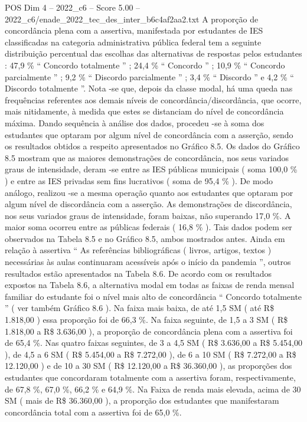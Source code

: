 \begin{textsample}{POS Dim 4 – 2022\_c6 – Score 5.00 – 2022\_c6/enade\_2022\_tec\_des\_inter\_b6c4af2aa2.txt}
A proporção de concordância plena com a assertiva, manifestada por estudantes de IES classificadas na categoria administrativa pública federal tem a seguinte distribuição percentual das escolhas das alternativas de respostas pelos estudantes : 47,9 \% “ Concordo totalmente ” ; 24,4 \% “ Concordo ” ; 10,9 \% “ Concordo parcialmente ” ; 9,2 \% “ Discordo parcialmente ” ; 3,4 \% “ Discordo ” e 4,2 \% “ Discordo totalmente ”.
Nota -se que, depois da classe modal, há uma queda nas frequências referentes aos demais níveis de concordância/discordância, que ocorre, mais nitidamente, à medida que estes se distanciam do nível de concordância máxima.
Dando sequência à análise dos dados, procedeu -se à soma dos estudantes que optaram por algum nível de concordância com a asserção, sendo os resultados obtidos a respeito apresentados no Gráfico 8.5.
Os dados do Gráfico 8.5 mostram que as maiores demonstrações de concordância, nos seus variados graus de intensidade, deram -se entre as IES públicas municipais ( soma 100,0 \% ) e entre as IES privadas sem fins lucrativos ( soma de 95,4 \% ).
De modo análogo, realizou -se a mesma operação quanto aos estudantes que optaram por algum nível de discordância com a asserção.
As demonstrações de discordância, nos seus variados graus de intensidade, foram baixas, não superando 17,0 \%.
A maior soma ocorreu entre as públicas federais ( 16,8 \% ).
Tais dados podem ser observados na Tabela 8.5 e no Gráfico 8.5, ambos mostrados antes.
Ainda em relação à assertiva “ As referências bibliográficas ( livros, artigos, textos ) necessárias às aulas continuaram acessíveis após o início da pandemia ”, outros resultados estão apresentados na Tabela 8.6.
De acordo com os resultados expostos na Tabela 8.6, a alternativa modal em todas as faixas de renda mensal familiar do estudante foi o nível mais alto de concordância “ Concordo totalmente ” ( ver também Gráfico 8.6 ).
Na faixa mais baixa, de até 1,5 SM ( até R\$ 1.818,00 ) essa proporção foi de 66,3 \%.
Na faixa seguinte, de 1,5 a 3 SM ( R\$ 1.818,00 a R\$ 3.636,00 ), a proporção de concordância plena com a assertiva foi de 65,4 \%.
Nas quatro faixas seguintes, de 3 a 4,5 SM ( R\$ 3.636,00 a R\$ 5.454,00 ), de 4,5 a 6 SM ( R\$ 5.454,00 a R\$ 7.272,00 ), de 6 a 10 SM ( R\$ 7.272,00 a R\$ 12.120,00 ) e de 10 a 30 SM ( R\$ 12.120,00 a R\$ 36.360,00 ), as proporções dos estudantes que concordaram totalmente com a assertiva foram, respectivamente, de 67,8 \%, 67,0 \%, 66,2 \% e 64,9 \%.
Na Faixa de renda mais elevada, acima de 30 SM ( mais de R\$ 36.360,00 ), a proporção dos estudantes que manifestaram concordância total com a assertiva foi de 65,0 \%.

\end{textsample}
